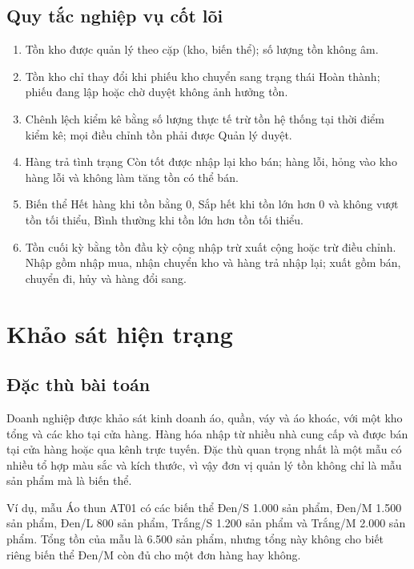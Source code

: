 \documentclass[12pt,a4paper]{report}
\begin{document}
\section{Quy tắc nghiệp vụ cốt lõi}

\begin{enumerate}[label=\textbf{QT-\arabic*:},leftmargin=1.35cm]
\item Tồn kho được quản lý theo cặp (kho, biến thể); số lượng tồn không âm.
\item Tồn kho chỉ thay đổi khi phiếu kho chuyển sang trạng thái Hoàn thành; phiếu đang lập hoặc chờ duyệt không ảnh hưởng tồn.
\item Chênh lệch kiểm kê bằng số lượng thực tế trừ tồn hệ thống tại thời điểm kiểm kê; mọi điều chỉnh tồn phải được Quản lý duyệt.
\item Hàng trả tình trạng Còn tốt được nhập lại kho bán; hàng lỗi, hỏng vào kho hàng lỗi và không làm tăng tồn có thể bán.
\item Biến thể Hết hàng khi tồn bằng 0, Sắp hết khi tồn lớn hơn 0 và không vượt tồn tối thiểu, Bình thường khi tồn lớn hơn tồn tối thiểu.
\item Tồn cuối kỳ bằng tồn đầu kỳ cộng nhập trừ xuất cộng hoặc trừ điều chỉnh. Nhập gồm nhập mua, nhận chuyển kho và hàng trả nhập lại; xuất gồm bán, chuyển đi, hủy và hàng đổi sang.
\end{enumerate}

\chapter{Khảo sát hiện trạng}

\section{Đặc thù bài toán}

Doanh nghiệp được khảo sát kinh doanh áo, quần, váy và áo khoác, với một kho tổng và các kho tại cửa hàng. Hàng hóa nhập từ nhiều nhà cung cấp và được bán tại cửa hàng hoặc qua kênh trực tuyến. Đặc thù quan trọng nhất là một mẫu có nhiều tổ hợp màu sắc và kích thước, vì vậy đơn vị quản lý tồn không chỉ là mẫu sản phẩm mà là biến thể.

Ví dụ, mẫu Áo thun AT01 có các biến thể Đen/S 1.000 sản phẩm, Đen/M 1.500 sản phẩm, Đen/L 800 sản phẩm, Trắng/S 1.200 sản phẩm và Trắng/M 2.000 sản phẩm. Tổng tồn của mẫu là 6.500 sản phẩm, nhưng tổng này không cho biết riêng biến thể Đen/M còn đủ cho một đơn hàng hay không.
\end{document}
